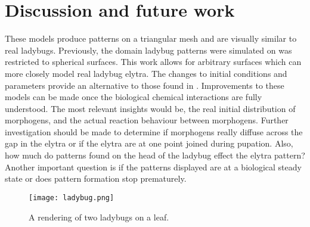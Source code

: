 \section{Discussion and future work}
These models produce patterns on a triangular mesh and are visually similar to real ladybugs. Previously, the domain ladybug patterns were simulated on was restricted to spherical surfaces. This work allows for arbitrary surfaces which can more closely model real ladybug elytra. The changes to initial conditions and parameters provide an alternative to those found in \citep{liaw2001}. Improvements to these models can be made once the biological chemical interactions are fully understood. The most relevant insights would be, the real initial distribution of morphogens, and the actual reaction behaviour between morphogens. Further investigation should be made to determine if morphogens really diffuse across the gap in the elytra or if the elytra are at one point joined during pupation. Also, how much do patterns found on the head of the ladybug effect the elytra pattern? Another important question is if the patterns displayed are at a biological steady state or does pattern formation stop prematurely.


\begin{figure}[p]
	\centering
	\texttt{[image: ladybug.png]}
	\caption{A rendering of two ladybugs on a leaf.}
	\label{fig:ladybugRender}
\end{figure}